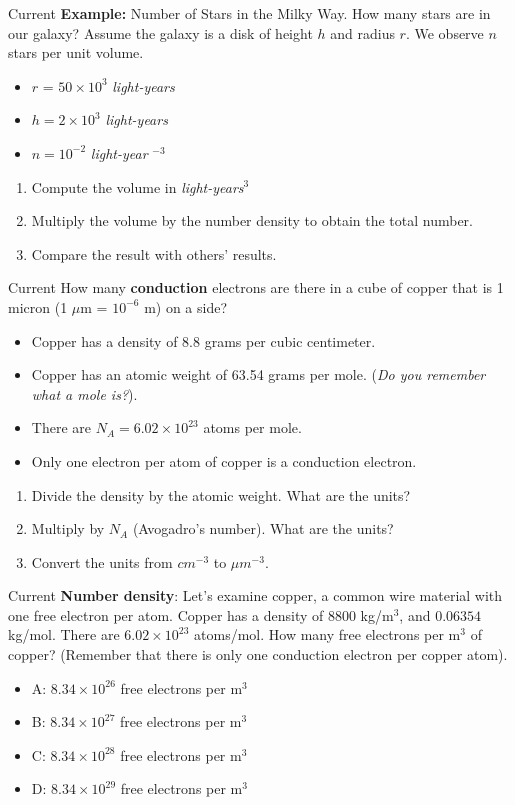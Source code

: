 \documentclass{beamer}
\begin{document}
\begin{frame}{Current}
\textbf{Example:} \alert{Number of Stars in the Milky Way}.  How many stars are in our galaxy?  Assume the galaxy is a disk of height $h$ and radius $r$.  We observe $n$ stars per unit volume.
\begin{itemize}
\item $r$ = $50 \times 10^3$ \textit{light-years}
\item $h = 2 \times 10^3$ \textit{light-years}
\item $n = 10^{-2}$ \textit{light-year} $^{-3}$
\end{itemize}
\begin{enumerate}
\item Compute the volume in \textit{light-years}$^3$
\item Multiply the volume by the number density to obtain the total number.
\item Compare the result with others' results.
\end{enumerate}
\end{frame}

\begin{frame}{Current}
\small
How many \textbf{conduction} electrons are there in a cube of copper that is 1 micron (1 $\mu$m = $10^{-6}$ m) on a side?
\begin{itemize}
\item Copper has a density of 8.8 grams per cubic centimeter.
\item Copper has an atomic weight of 63.54 grams per mole.  (\textit{Do you remember what a mole is?}).
\item There are $N_A = 6.02 \times 10^{23}$ atoms per mole.
\item Only one electron per atom of copper is a conduction electron.
\end{itemize} \hrulefill
\begin{enumerate}
\item Divide the density by the atomic weight.  What are the units?
\item Multiply by $N_A$ (Avogadro's number).  What are the units?
\item Convert the units from $cm^{-3}$ to $\mu m^{-3}$.
\end{enumerate}
\end{frame}

\begin{frame}{Current}
\textbf{Number density}: Let's examine copper, a common wire material with one free electron per atom.  Copper has a density of 8800 kg/m$^3$, and $0.06354$ kg/mol.  There are $6.02 \times 10^{23}$ atoms/mol.  How many free electrons per m$^3$ of copper? (Remember that there is only one conduction electron per copper atom).
\begin{itemize}
\item A: $8.34 \times 10^{26}$ free electrons per m$^3$
\item B: $8.34 \times 10^{27}$ free electrons per m$^3$
\item C: $8.34 \times 10^{28}$ free electrons per m$^3$
\item D: $8.34 \times 10^{29}$ free electrons per m$^3$
\end{itemize}
\end{frame}
\end{document}

